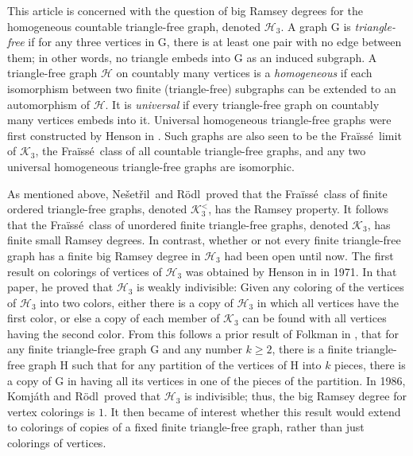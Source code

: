 \documentclass{amsart}
\theoremstyle{remark}
\theoremstyle{definition}
\theoremstyle{remark}
\newcommand{\G}{\mathrm{G}}
\newcommand{\HH}{\mathrm{H}}
\newcommand{\Nesetril}{Ne{\v{s}}et{\v{r}}il}
\newcommand{\Rodl}{R{\"{o}}dl}
\newcommand{\Fraisse}{Fra{\"{i}}ss{\'{e}}}
\begin{document}
This article is concerned with the question of big Ramsey degrees for the  homogeneous countable  triangle-free graph, denoted $\mathcal{H}_3$.
A graph $\G$ is {\em triangle-free} if for any three vertices  in $\G$, there is at least one pair with no edge between them;
in other words, no triangle embeds into $\G$ as an induced subgraph.
A triangle-free graph $\mathcal{H}$ on countably many vertices is a {\em homogeneous}
if each isomorphism between two finite (triangle-free) subgraphs can be extended to an automorphism of $\mathcal{H}$.
It is {\em universal} if every triangle-free graph on countably many vertices embeds into it. 
Universal homogeneous triangle-free graphs were first constructed by Henson in  \cite{Henson71}.
Such graphs are also seen to be
the \Fraisse\ limit of $\mathcal{K}_3$, the \Fraisse\ class of all countable triangle-free graphs,
 and
any two universal  homogeneous triangle-free graphs are isomorphic.


As mentioned above,
 \Nesetril\ and \Rodl\
proved that  the \Fraisse\ class of finite ordered triangle-free graphs, denoted $\mathcal{K}^{<}_3$, has the Ramsey property.
It follows that the \Fraisse\ class of  unordered finite triangle-free graphs, denoted
$\mathcal{K}_3$, has finite small Ramsey degrees.
In contrast, whether or not
every finite triangle-free graph has  a
finite  big Ramsey degree in  $\mathcal{H}_3$
had been open until now.
The first result on colorings of vertices of $\mathcal{H}_3$
 was obtained by Henson in \cite{Henson71} in 1971.
In that paper,
 he proved that  $\mathcal{H}_3$ is weakly indivisible:
Given  any coloring of the vertices  of $\mathcal{H}_3$ into  two colors,
either
there is a copy  of $\mathcal{H}_3$ in which all vertices have the first  color,
or else a copy of each member of $\mathcal{K}_3$ can be found with all vertices having the second color.
From this follows a prior result of Folkman in \cite{Folkman70}, that  for any finite triangle-free graph $\G$ and any number $k\ge 2$,
there is a finite triangle-free  graph $\HH$ such that for any partition of the vertices of $\mathrm{H}$ into $k$ pieces,
there is a copy of $\G$ in having all its vertices in one of the pieces of the partition.
In 1986,
Komj\'{a}th and \Rodl\  proved
that $\mathcal{H}_3$ is indivisible;
thus, the  big Ramsey degree for vertex colorings is $1$.
It then became of interest whether this result would extend to colorings of copies of a fixed finite triangle-free graph, rather than just colorings of vertices.
\end{document}
